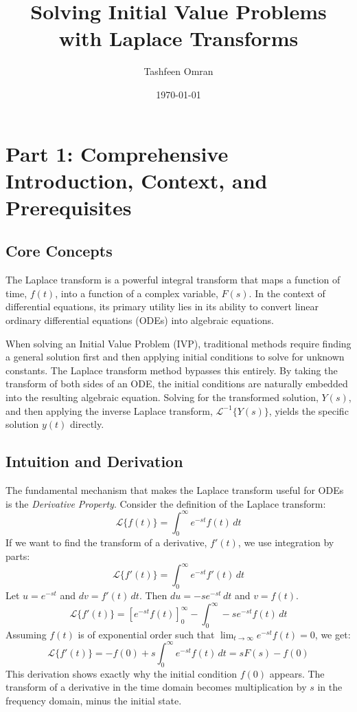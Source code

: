 \documentclass[11pt, letterpaper]{article}
\title{Solving Initial Value Problems with Laplace Transforms}
\author{Tashfeen Omran}
\date{\today}
\theoremstyle{definition}
\theoremstyle{remark}
\newcommand{\Lap}{\mathcal{L}}
\begin{document}
\maketitle
\tableofcontents
\newpage

\section{Part 1: Comprehensive Introduction, Context, and Prerequisites}

\subsection{Core Concepts}
The Laplace transform is a powerful integral transform that maps a function of time, $f(t)$, into a function of a complex variable, $F(s)$. In the context of differential equations, its primary utility lies in its ability to convert linear ordinary differential equations (ODEs) into algebraic equations. 

When solving an Initial Value Problem (IVP), traditional methods require finding a general solution first and then applying initial conditions to solve for unknown constants. The Laplace transform method bypasses this entirely. By taking the transform of both sides of an ODE, the initial conditions are naturally embedded into the resulting algebraic equation. Solving for the transformed solution, $Y(s)$, and then applying the inverse Laplace transform, $\Lap^{-1}\{Y(s)\}$, yields the specific solution $y(t)$ directly.

\subsection{Intuition and Derivation}
The fundamental mechanism that makes the Laplace transform useful for ODEs is the \textit{Derivative Property}. Consider the definition of the Laplace transform:
\[ \Lap\{f(t)\} = \int_{0}^{\infty} e^{-st} f(t) \, dt \]
If we want to find the transform of a derivative, $f'(t)$, we use integration by parts:
\[ \Lap\{f'(t)\} = \int_{0}^{\infty} e^{-st} f'(t) \, dt \]
Let $u = e^{-st}$ and $dv = f'(t) \, dt$. Then $du = -s e^{-st} \, dt$ and $v = f(t)$.
\[ \Lap\{f'(t)\} = \left[ e^{-st} f(t) \right]_{0}^{\infty} - \int_{0}^{\infty} -s e^{-st} f(t) \, dt \]
Assuming $f(t)$ is of exponential order such that $\lim_{t \to \infty} e^{-st} f(t) = 0$, we get:
\[ \Lap\{f'(t)\} = -f(0) + s \int_{0}^{\infty} e^{-st} f(t) \, dt = sF(s) - f(0) \]
This derivation shows exactly why the initial condition $f(0)$ appears. The transform of a derivative in the time domain becomes multiplication by $s$ in the frequency domain, minus the initial state.
\end{document}
